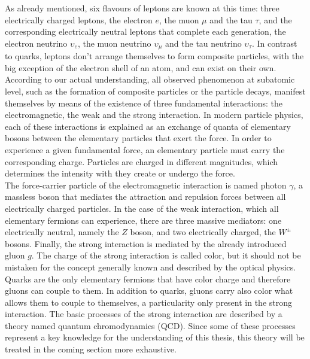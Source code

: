 \documentclass[12pt,a4paper]{report}
\begin{document}
\hspace{-0.53cm} As already mentioned, six flavours of leptons are known at this time: three electrically charged leptons, the electron $e$, the muon $\mu$ and the tau $\tau$, and the corresponding electrically neutral leptons that complete each generation, the electron neutrino $\upsilon_{e}$, the muon neutrino $\upsilon_{\mu}$ and the tau neutrino $\upsilon_{\tau}$. In contrast to quarks, leptons don't arrange themselves to form composite particles, with the big exception of the electron shell of an atom, and can exist on their own. \\
According to our actual understanding, all observed phenomenon at subatomic level, such as the formation of composite particles or the particle decays, manifest themselves by means of the existence of three fundamental interactions: the electromagnetic, the weak and the strong interaction. In modern particle physics, each of these interactions is explained as an exchange of quanta of elementary bosons between the elementary particles that exert the force. In order to experience a given fundamental force, an elementary particle must carry the corresponding charge. Particles are charged in different magnitudes, which determines the intensity with they create or undergo the force. \\
The force-carrier particle of the electromagnetic interaction is named photon $\gamma$, a massless boson that mediates the attraction and repulsion forces between all electrically charged particles. In the case of the weak interaction, which all elementary fermions can experience, there are three massive mediators: one electrically neutral, namely the $Z$ boson, and two electrically charged, the $W^{\pm}$ bosons. Finally, the strong interaction is mediated by the already introduced gluon $g$. The charge of the strong interaction is called color, but it should not be mistaken for the concept generally known and described by the optical physics. Quarks are the only elementary fermions that have color charge and therefore gluons can couple to them. In addition to quarks, gluons carry also color what allows them to couple to themselves, a particularity only present in the strong interaction. The basic processes of the strong interaction are described by a theory named quantum chromodynamics (QCD). Since some of these processes represent a key knowledge for the understanding of this thesis, this theory will be treated in the coming section more exhaustive.
\end{document}
